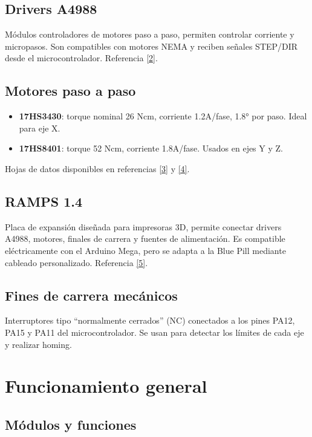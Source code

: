 \documentclass[12pt]{article}
\begin{document}
\subsection{Drivers A4988}
Módulos controladores de motores paso a paso, permiten controlar corriente y micropasos. Son compatibles con motores NEMA y reciben señales STEP/DIR desde el microcontrolador. Referencia \hyperref[ref2]{[2]}.

\subsection{Motores paso a paso}
\begin{itemize}
  \item \textbf{17HS3430}: torque nominal 26 Ncm, corriente 1.2A/fase, 1.8° por paso. Ideal para eje X.
  \item \textbf{17HS8401}: torque 52 Ncm, corriente 1.8A/fase. Usados en ejes Y y Z.
\end{itemize}
Hojas de datos disponibles en referencias \hyperref[ref3]{[3]} y \hyperref[ref4]{[4]}.

\subsection{RAMPS 1.4}
Placa de expansión diseñada para impresoras 3D, permite conectar drivers A4988, motores, finales de carrera y fuentes de alimentación. Es compatible eléctricamente con el Arduino Mega, pero se adapta a la Blue Pill mediante cableado personalizado. Referencia \hyperref[ref5]{[5]}.

\subsection{Fines de carrera mecánicos}
Interruptores tipo “normalmente cerrados” (NC) conectados a los pines PA12, PA15 y PA11 del microcontrolador. Se usan para detectar los límites de cada eje y realizar homing.


\section{Funcionamiento general}
\subsection*{Módulos y funciones}
\end{document}
